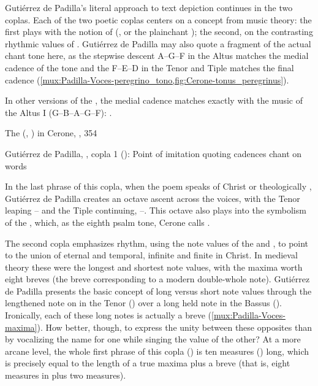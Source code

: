Gutiérrez de Padilla's literal approach to text depiction continues in the two
coplas.
Each of the two poetic coplas centers on a concept from music theory: the first
plays with the notion of  (, or
the plainchant ); the second, on the contrasting
rhythmic values of .
Gutiérrez de Padilla may also quote a fragment of the actual chant tone here,
as the stepwise descent A--G--F in the Altus matches the medial cadence of the
tone and the F--E--D in the Tenor and Tiple matches the final cadence
(\cref{mux:Padilla-Voces-peregrino_tono,fig:Cerone-tonus_peregrinus}).%
\begin{Footnote}
    In other versions of the , the medial cadence matches
    exactly with the music of the Altus I (G--B\fl{}--A--G--F):
    \autocite[160]{Catholic:LiberUsualis1956}.
\end{Footnote}

{The  (, ) in Cerone, , 354}

{Gutiérrez de Padilla, , copla 1
(): Point of imitation quoting cadences chant  on words }

In the last phrase of this copla, when the poem speaks of Christ  or theologically , Gutiérrez
de Padilla creates an octave ascent across the voices, with the Tenor leaping
-- and the Tiple continuing, --.
This octave also plays into the symbolism of the ,
which, as the eighth psalm tone, Cerone calls .%
    \Autocite[354]{Cerone:Melopeo}

The second copla emphasizes rhythm, using the note values of the 
and , to point to the union of eternal and temporal, infinite and
finite in Christ.
In medieval theory these were the longest and shortest note values, with the
maxima worth eight breves (the breve corresponding to a modern double-whole
note).
Gutiérrez de Padilla presents the basic concept of long versus short note
values through the lengthened note on  in the Tenor
() over a long held note in the Bassus
().
Ironically, each of these long notes is actually a breve
(\cref{mux:Padilla-Voces-maxima}).
How better, though, to express the unity between these opposites than by
vocalizing the name for one while singing the value of the other?
At a more arcane level, the whole first phrase of this copla
() is ten measures () long, which is
precisely equal to the length of a true maxima plus a breve (that is, eight
measures in \meterCThree{} plus two measures).


